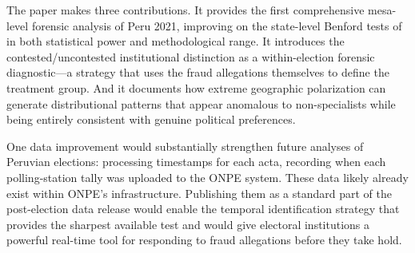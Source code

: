 \documentclass[12pt]{article}
\begin{document}
The paper makes three contributions. It provides the first comprehensive
mesa-level forensic analysis of Peru 2021, improving on the state-level
Benford tests of \citet{isea2021} in both statistical power and methodological
range. It introduces the contested/uncontested institutional distinction as a
within-election forensic diagnostic---a strategy that uses the fraud
allegations themselves to define the treatment group. And it documents
how extreme geographic polarization can generate distributional patterns
that appear anomalous to non-specialists while being entirely consistent
with genuine political preferences.

One data improvement would substantially strengthen future analyses of
Peruvian elections: processing timestamps for each acta, recording when
each polling-station tally was uploaded to the ONPE system. These data
likely already exist within ONPE's infrastructure. Publishing them as a
standard part of the post-election data release would enable the temporal
identification strategy that provides the sharpest available test and would
give electoral institutions a powerful real-time tool for responding to
fraud allegations before they take hold.

\newpage



\newpage

\end{document}
